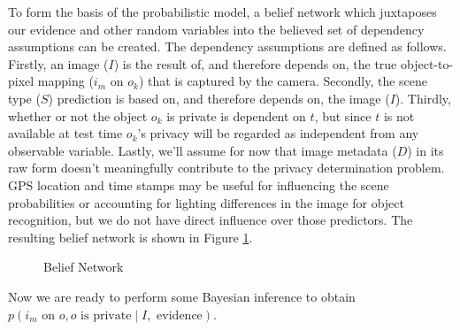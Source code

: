 \documentclass[11pt]{article}
\begin{document}
To form the basis of the probabilistic model, a belief network which juxtaposes our evidence and other random variables into the believed set of dependency assumptions can be created. The dependency assumptions are defined as follows.  Firstly, an image ($I$) is the result of, and therefore depends on, the true object-to-pixel mapping ($i_m$ on $o_k$) that is captured by the camera.  Secondly, the scene type ($S$) prediction is based on, and therefore depends on, the image ($I$).  Thirdly, whether or not the object $o_k$ is private is dependent on $t$, but since $t$ is not available at test time $o_k$'s privacy will be regarded as independent from any observable variable.  Lastly, we'll assume for now that image metadata ($D$) in its raw form doesn't meaningfully contribute to the privacy determination problem.  GPS location and time stamps may be useful for influencing the scene probabilities or accounting for lighting differences in the image for object recognition, but we do not have direct influence over those predictors.  The resulting belief network is shown in Figure \ref{fig:belief}.

\begin{figure}[ht]
\centering
    \caption{Belief Network}\label{fig:belief}
\end{figure}

Now we are ready to perform some Bayesian inference to obtain $p(i_m \textrm{ on } o, o \textrm{ is private} \mid I, \textrm{ evidence})$.
\end{document}

